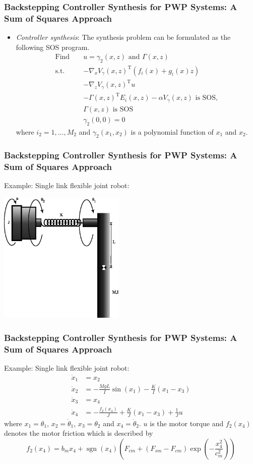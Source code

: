 \documentclass{beamer}
\DeclareMathOperator{\sign}{sgn}
\newcommand{\TR}{\text{T}}
\newcommand{\beq}{\begin{equation*}}
\newcommand{\eeq}{\end{equation*}}
\begin{document}
\frame
  {
    \frametitle{Backstepping Controller Synthesis for PWP Systems: A Sum of Squares Approach}
\begin{itemize}
\item \emph{Controller synthesis}: The synthesis problem can be formulated as the following SOS program.
\begin{eqnarray*}
\text{Find }&&u=\gamma_2(x,z)\text{ and } \Gamma(x,z)\\
\text{s.t.}&&-\nabla_{x} V_{\gamma}(x,z)^\TR(f_{i}(x)+g_{i}(x)z)\\
&&-\nabla_{z} V_{\gamma}(x,z)^\TR u\nonumber\\
&&-\Gamma(x,z)^\TR E_{i}(x,z)-\alpha V_\gamma(x,z)\text{\ is SOS},\nonumber\\
&&\Gamma(x,z)\text{\ is SOS}\nonumber\\
&&\gamma_2(0,0)=0
\end{eqnarray*}
where $i_2=1,\ldots,M_2$ and $\gamma_2(x_1,x_2)$ is a polynomial function of $x_1$ and $x_2$. 
\end{itemize}
}

\frame
  {
    \frametitle{Backstepping Controller Synthesis for PWP Systems: A Sum of Squares Approach}
Example: Single link flexible joint robot:
\centerline{\includegraphics[width=6cm]{images/SLFJR.eps}}
}
\frame
  {
    \frametitle{Backstepping Controller Synthesis for PWP Systems: A Sum of Squares Approach}
Example: Single link flexible joint robot:
\begin{align*}
\dot x_1& = x_2\\
\dot x_2& = -\frac{MgL}{I}\sin(x_1)-\frac{K}{I}(x_1-x_3)\\
\dot x_3& = x_4\\
\dot x_4& = -\frac{f_2(x_4)}{J}+\frac{K}{J}(x_1-x_3)+\frac{1}{J}u
\end{align*}
where $x_1=\theta_1$, $x_2=\dot\theta_1$, $x_3=\theta_2$ and $x_4=\dot \theta_2$. $u$ is the motor torque and $f_2(x_4)$ denotes the motor friction which is described by
\beq
f_2(x_4)=b_mx_4+\sign(x_4)\left(F_{cm}+(F_{sm}-F_{cm})\exp(-\frac{x_4^2}{c_m^2})\right)
\eeq
}
\end{document}

